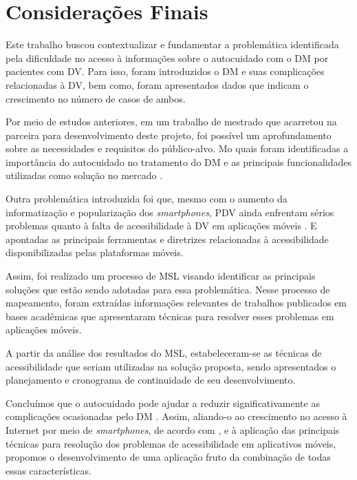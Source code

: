 \chapter{Considerações Finais}
\label{ch:conclusion}

Este trabalho buscou contextualizar e fundamentar a problemática identificada pela dificuldade
no acesso à informações sobre o autocuidado com o DM por pacientes com DV\@. Para isso, foram introduzidos
o DM e suas complicações relacionadas à DV, bem como, foram apresentados dados que indicam o crescimento no
número de casos de ambos.

Por meio de estudos anteriores, em um trabalho de mestrado que acarretou na parceira para desenvolvimento deste
projeto, foi possível um aprofundamento sobre as necessidades e requisitos do público-alvo.
Mo quais foram identificadas a importância do autocuidado no tratamento do DM e as principais funcionalidades utilizadas
como solução no mercado \cite{Sobral2021}.

Outra problemática introduzida foi que, mesmo com o aumento da informatização e popularização dos \emph{smartphones},
PDV ainda enfrentam sérios problemas quanto à falta de acessibilidade à DV em aplicações móveis \cite{Shera2021285}.
E apontadas as principais ferramentas e diretrizes relacionadas à acessibilidade disponibilizadas pelas plataformas móveis.

Assim, foi realizado um processo de MSL visando identificar as principais soluções que estão sendo adotadas
para essa problemática. Nesse processo de mapeamento, foram extraídas informações relevantes
de trabalhos publicados em bases acadêmicas que apresentaram técnicas para resolver esses problemas
em aplicações móveis.

A partir da análise dos resultados do MSL, estabeleceram-se as técnicas de acessibilidade que seriam utilizadas
na solução proposta, sendo apresentados o planejamento e cronograma de continuidade de seu desenvolvimento.

Concluímos que o autocuidado pode ajudar a reduzir significativamente as complicações ocasionadas pelo DM \cite{ADA2019}.
Assim, aliando-o ao crescimento no acesso à Internet por meio de \emph{smartphones}, de acordo com ,
e à aplicação das principais técnicas para resolução dos problemas de acessibilidade em aplicativos móveis, propomos o
desenvolvimento de uma aplicação fruto da combinação de todas essas características.